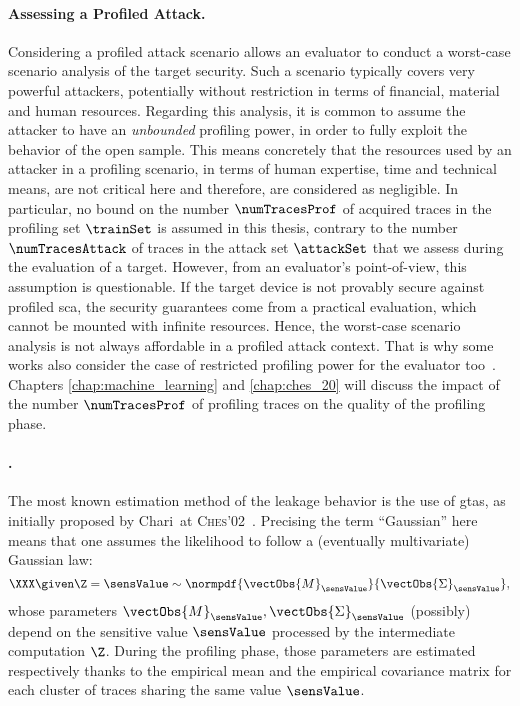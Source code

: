 \paragraph{Assessing a Profiled Attack.}
Considering a profiled attack scenario allows an evaluator to conduct a worst-case scenario analysis of the target security.
Such a scenario typically covers very powerful attackers, potentially without restriction in terms of financial, material and human resources.
Regarding this analysis, it is common to assume the attacker to have an \emph{unbounded} profiling power, in order to fully exploit the behavior of the open sample.
This means concretely that the resources used by an attacker in a profiling scenario, in terms of human expertise, time and technical means, are not critical here and therefore, are considered as negligible.
In particular, no bound on the number \(\numTracesProf\) of acquired traces in the profiling set \(\trainSet\) is assumed in this thesis, contrary to the number \(\numTracesAttack\) of traces in the attack set \(\attackSet\) that we assess during the evaluation of a target.
However, from an evaluator's point-of-view, this assumption is questionable.
If the target device is not provably secure against profiled \gls{sca}, the security guarantees come from a practical evaluation, which cannot be mounted with infinite resources.
Hence, the worst-case scenario analysis is not always affordable in a profiled attack context.
That is why some works also consider the case of restricted profiling power for the evaluator too~\cite{picek_profiling_2019}.
Chapters \ref{chap:machine_learning} and \ref{chap:ches_20} will discuss the impact of the number \(\numTracesProf\) of profiling traces on the quality of the profiling phase.


\paragraph{.}
The most known estimation method of the leakage behavior is the use of \glspl{gta}, as initially proposed by Chari \etal{}\,at \textsc{Ches}'02~\cite{chari_template_2002}.
Precising the term ``Gaussian'' here means that one assumes the likelihood to follow a (eventually multivariate) Gaussian law:
\begin{equation}
    \XXX \given \Z = \sensValue \sim \normpdf{\vectObs{M}_\sensValue}{\vectObs{\Sigma}_\sensValue},
\end{equation}
whose parameters \(\vectObs{M}_\sensValue, \vectObs{\Sigma}_\sensValue\) (possibly) depend on the sensitive value \(\sensValue\) processed by the intermediate computation \(\Z\).
During the profiling phase, those parameters are estimated respectively thanks to the empirical mean and the empirical covariance matrix for each cluster of traces sharing the same value \(\sensValue\).

